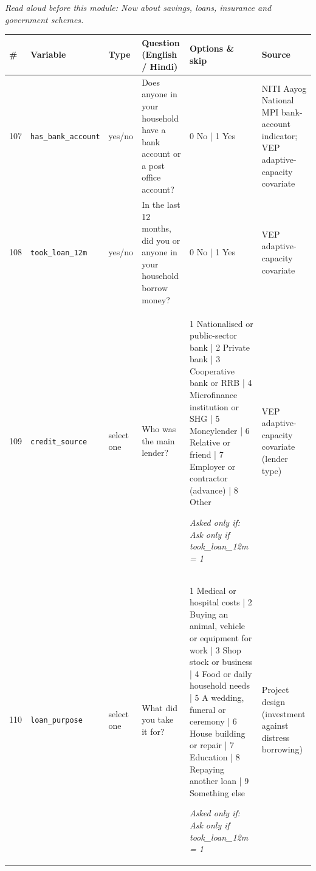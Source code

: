 \documentclass[9pt,a4paper,landscape]{article}
\begin{document}
{\small\itshape Read aloud before this module: Now about savings, loans, insurance and government schemes.}\\[5pt]
\begin{longtable}{@{}p{0.5cm}p{3.3cm}p{1.7cm}p{7.3cm}p{5.6cm}p{5.4cm}@{}}
\toprule \footnotesize\textbf{\#} & \footnotesize\textbf{Variable} & \footnotesize\textbf{Type} & \footnotesize\textbf{Question (English / Hindi)} & \footnotesize\textbf{Options {\&} skip} & \footnotesize\textbf{Source}\\ \midrule
\endhead
\footnotesize 107 & \footnotesize\texttt{has\_bank\_account} & \scriptsize yes/no & \footnotesize Does anyone in your household have a bank account or a post office account?\par\vspace{1pt}{\footnotesize\color{hdr}{\hifont क्या आपके घर में किसी का बैंक खाता या डाकघर का खाता है?}} & \scriptsize 0 No | 1 Yes & \scriptsize NITI Aayog National MPI bank-account indicator; VEP adaptive-capacity covariate\\
\footnotesize 108 & \footnotesize\texttt{took\_loan\_12m} & \scriptsize yes/no & \footnotesize In the last 12 months, did you or anyone in your household borrow money?\par\vspace{1pt}{\footnotesize\color{hdr}{\hifont पिछले 12 महीनों में क्या आपने या आपके घर के किसी सदस्य ने पैसा उधार लिया?}} & \scriptsize 0 No | 1 Yes & \scriptsize VEP adaptive-capacity covariate\\
\footnotesize 109 & \footnotesize\texttt{credit\_source} & \scriptsize select one & \footnotesize Who was the main lender?\par\vspace{1pt}{\footnotesize\color{hdr}{\hifont मुख्य रूप से किससे उधार लिया?}} & \scriptsize 1 Nationalised or public-sector bank | 2 Private bank | 3 Cooperative bank or RRB | 4 Microfinance institution or SHG | 5 Moneylender | 6 Relative or friend | 7 Employer or contractor (advance) | 8 Other\par\vspace{1pt}\textit{Asked only if: Ask only if took\_loan\_12m = 1} & \scriptsize VEP adaptive-capacity covariate (lender type)\\
\footnotesize 110 & \footnotesize\texttt{loan\_purpose} & \scriptsize select one & \footnotesize What did you take it for?\par\vspace{1pt}{\footnotesize\color{hdr}{\hifont वह क़र्ज़ आपने किस काम के लिए लिया था?}} & \scriptsize 1 Medical or hospital costs | 2 Buying an animal, vehicle or equipment for work | 3 Shop stock or business | 4 Food or daily household needs | 5 A wedding, funeral or ceremony | 6 House building or repair | 7 Education | 8 Repaying another loan | 9 Something else\par\vspace{1pt}\textit{Asked only if: Ask only if took\_loan\_12m = 1} & \scriptsize Project design (investment against distress borrowing)\\

\end{longtable}
\end{document}
